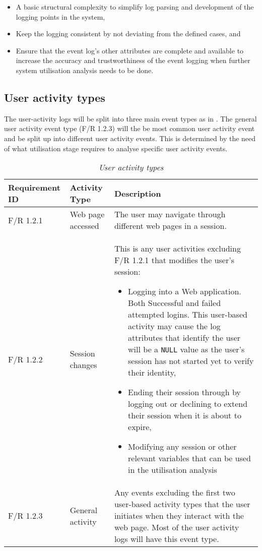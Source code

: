 \begin{itemize}
	\item A basic structural complexity to simplify log parsing and development of the logging points in the system,
	\item Keep the logging consistent by not deviating from the defined cases, and
	\item Ensure that the event log's other attributes are complete and available to increase the accuracy and trustworthiness of the event logging when further system utilisation analysis needs to be done. 
\end{itemize}

\subsection{User activity types}\label{sec:ch2_userActivityTypes}
The user-activity logs will be split into three main event types as in . The general user activity event type (F/R 1.2.3) will the be most common user activity event and be split up into different user activity events. This is determined by the need of what utilisation stage requires to analyse specific user activity events. 

\begin{table}[!htb]
	\centering
	\caption[User activity types]
	{\textit{User activity types}}
	\label{tbl:ch2_userActivityTypes}
	\begin{tabularx}{\textwidth}{|l|l|X|}
		\hline \textbf{Requirement ID} & \textbf{Activity Type} & \textbf{Description} \\
		\hline F/R 1.2.1 & Web page accessed & The user may navigate through different web pages in a session.\\
		\hline F/R 1.2.2 & Session changes & This is any user activities excluding F/R 1.2.1 that modifies the user's session:
		\begin{itemize}
			\item Logging into a Web application. Both Successful and failed attempted logins. This user-based activity may cause the log attributes that identify the user will be a \texttt{NULL} value as the user's session has not started yet to verify their identity,
			\item Ending their session through by logging out or declining to extend their session when it is about to expire,
			\item Modifying any session or other relevant variables that can be used in the utilisation analysis
		\end{itemize}\\
		\hline F/R 1.2.3 & General activity & Any events excluding the first two user-based activity types that the user initiates when they interact with the web page. Most of the user activity logs will
		have this event type.\\ 
		\hline
	\end{tabularx}
\end{table}

